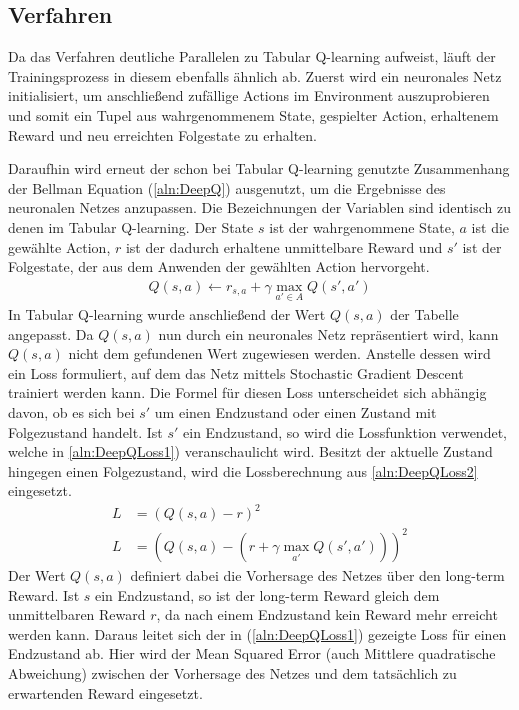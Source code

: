 \documentclass[11pt]{scrartcl}
\begin{document}
\subsection{Verfahren}
\label{sec:deepq-procedure}
Da das Verfahren deutliche Parallelen zu Tabular Q-learning aufweist, läuft der
Trainingsprozess in diesem ebenfalls ähnlich ab. Zuerst wird ein neuronales Netz
initialisiert, um anschließend zufällige Actions im Environment auszuprobieren
und somit ein Tupel aus wahrgenommenem State, gespielter Action, erhaltenem
Reward und neu erreichten Folgestate zu erhalten.

Daraufhin wird erneut der schon bei Tabular Q-learning genutzte Zusammenhang der Bellman
Equation (\ref{aln:DeepQ}) ausgenutzt, um die Ergebnisse des neuronalen Netzes anzupassen.
Die Bezeichnungen der Variablen sind identisch zu denen im Tabular Q-learning. Der State
$s$ ist der wahrgenommene State, $a$ ist die gewählte Action, $r$ ist der dadurch
erhaltene unmittelbare Reward und $s'$ ist der Folgestate, der aus dem Anwenden der
gewählten Action hervorgeht.
\begin{align}
  Q(s, a) \leftarrow r_{s,a} + \gamma \max_{a' \in A}Q(s', a') \label{aln:DeepQ}
\end{align}
\noindent
In Tabular Q-learning wurde anschließend der Wert $Q(s, a)$ der Tabelle angepasst. Da 
$Q(s, a)$ nun durch ein neuronales Netz repräsentiert wird, kann $Q(s, a)$ nicht dem
gefundenen Wert zugewiesen werden. Anstelle dessen wird ein Loss formuliert, auf dem
das Netz mittels Stochastic Gradient Descent trainiert werden kann. Die Formel für
diesen Loss unterscheidet sich abhängig davon, ob es sich bei $s'$ um einen Endzustand
oder einen Zustand mit Folgezustand handelt. Ist $s'$ ein Endzustand, so wird die
Lossfunktion verwendet, welche in \autoref{aln:DeepQLoss1}) veranschaulicht wird.
Besitzt der aktuelle Zustand hingegen einen Folgezustand, wird die Lossberechnung
aus \autoref{aln:DeepQLoss2} eingesetzt.
\begin{align}
  L & = \left(Q(s, a) - r\right)^2 \label{aln:DeepQLoss1} \\
  L & = \left(Q(s, a) - \left(r + \gamma \max_{a'} Q(s', a')\right)\right)^2 \label{aln:DeepQLoss2}
\end{align}
\noindent
Der Wert $Q(s, a)$ definiert dabei die Vorhersage des Netzes über den long-term Reward.
Ist $s$ ein Endzustand, so ist der long-term Reward gleich dem unmittelbaren Reward $r$,
da nach einem Endzustand kein Reward mehr erreicht werden kann. Daraus leitet sich der in
(\ref{aln:DeepQLoss1}) gezeigte Loss für einen Endzustand ab. Hier wird der Mean Squared
Error (auch Mittlere quadratische Abweichung) zwischen der Vorhersage des Netzes und dem
tatsächlich zu erwartenden Reward eingesetzt.
\end{document}
